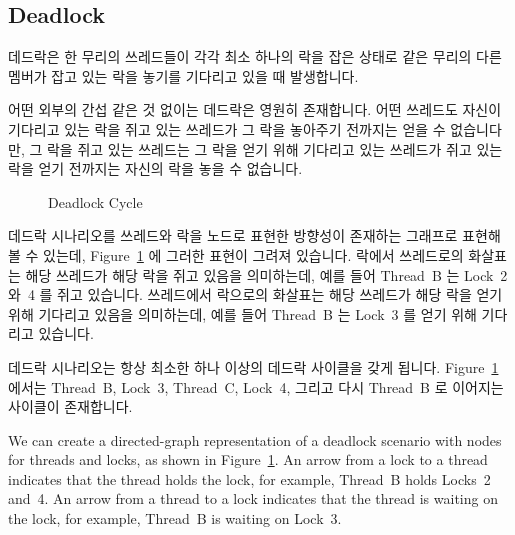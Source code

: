 \subsection{Deadlock}
\label{sec:locking:Deadlock}

데드락은 한 무리의 쓰레드들이 각각 최소 하나의 락을 잡은 상태로 같은 무리의
다른 멤버가 잡고 있는 락을 놓기를 기다리고 있을 때 발생합니다.

어떤 외부의 간섭 같은 것 없이는 데드락은 영원히 존재합니다.
어떤 쓰레드도 자신이 기다리고 있는 락을 쥐고 있는 쓰레드가 그 락을 놓아주기
전까지는 얻을 수 없습니다만, 그 락을 쥐고 있는 쓰레드는 그 락을 얻기 위해
기다리고 있는 쓰레드가 쥐고 있는 락을 얻기 전까지는 자신의 락을 놓을 수
없습니다.

\begin{figure}[tb]
\centering
{}
\caption{Deadlock Cycle}
\label{fig:locking:Deadlock Cycle}
\end{figure}

데드락 시나리오를 쓰레드와 락을 노드로 표현한 방향성이 존재하는 그래프로 표현해
볼 수 있는데, Figure~\ref{fig:locking:Deadlock Cycle} 에 그러한 표현이 그려져
있습니다.
락에서 쓰레드로의 화살표는 해당 쓰레드가 해당 락을 쥐고 있음을 의미하는데, 예를
들어 Thread~B 는 Lock~2 와~4 를 쥐고 있습니다.
쓰레드에서 락으로의 화살표는 해당 쓰레드가 해당 락을 얻기 위해 기다리고 있음을
의미하는데, 예를 들어 Thread~B 는 Lock~3 를 얻기 위해 기다리고 있습니다.

데드락 시나리오는 항상 최소한 하나 이상의 데드락 사이클을 갖게 됩니다.
Figure~\ref{fig:locking:Deadlock Cycle} 에서는 Thread~B, Lock~3, Thread~C,
Lock~4, 그리고 다시 Thread~B 로 이어지는 사이클이 존재합니다.
\iffalse

We can create a directed-graph representation of a deadlock scenario
with nodes for threads and locks, as shown in
Figure~\ref{fig:locking:Deadlock Cycle}.
An arrow from a lock to a thread indicates that the thread holds
the lock, for example, Thread~B holds Locks~2 and~4.
An arrow from a thread to a lock indicates that the thread is waiting
on the lock, for example, Thread~B is waiting on Lock~3.


